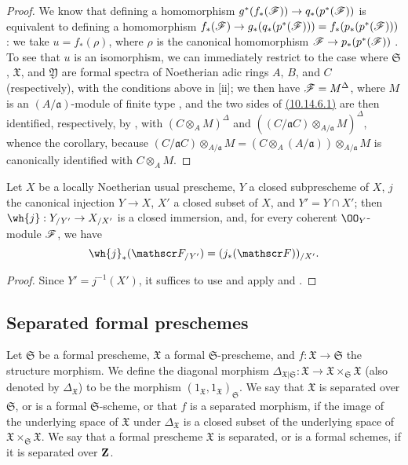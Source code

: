 \begin{proof}
\label{proof-1.10.14.6}
We know that defining a homomorphism $g^*(f_*(\sh{F})) \to q_*(p^*(\sh{F}))$ is equivalent to defining a homomorphism $f_*(\sh{F}) \to g_*(q_*(p^*(\sh{F}))) = f_*(p_*(p^*(\sh{F})))$ :
we take $u=f_*(\rho)$, where $\rho$ is the canonical homomorphism $\sh{F}\to p_*(p^*(\sh{F}))$ .
To see that $u$ is an isomorphism, we can immediately restrict to the case where $\mathfrak{S}$, $\mathfrak{X}$, and $\mathfrak{Y}$ are formal spectra of Noetherian adic rings $A$, $B$, and $C$ (respectively), with the conditions above in [ii];
we then have $\mathscr{F}=M^\Delta$, where $M$ is an $(A/\mathfrak{a})$-module of finite type , and the two sides of \hyperref[1.10.14.6]{(10.14.6.1)} are then identified, respectively, by , with $(C\otimes_A M)^\Delta$ and $((C/\mathfrak{a}C)\otimes_{A/\mathfrak{a}}M)^\Delta$, whence the corollary, because $(C/\mathfrak{a}C)\otimes_{A/\mathfrak{a}}M = (C\otimes_A(A/\mathfrak{a}))\otimes_{A/\mathfrak{a}}M$ is canonically identified with $C\otimes_A M$.
\end{proof}

\begin{cor}[10.14.7]
\label{1.10.14.7}
Let $X$ be a locally Noetherian usual prescheme, $Y$ a closed subprescheme of $X$, $j$ the canonical injection $Y\to X$, $X'$ a closed subset of $X$, and $Y'=Y\cap X'$;
then $\wh{j}:Y_{/Y'}\to X_{/X'}$ is a closed immersion, and, for every coherent $\OO_Y$-module $\mathscr{F}$, we have
\[
    \wh{j}_*(\sh{F}_{/Y'}) = (j_*(\sh{F}))_{/X'}.
\]
\end{cor}

\begin{proof}
\label{proof-1.10.14.7}
Since $Y'=j^{-1}(X')$, it suffices to use  and apply  and .
\end{proof}

\subsection{Separated formal preschemes}
\label{subsection:1.10.15}

\begin{defn}[10.15.1]
\label{1.10.15.1}
Let $\mathfrak{S}$ be a formal prescheme, $\mathfrak{X}$ a formal $\mathfrak{S}$-prescheme, and $f:\mathfrak{X}\to\mathfrak{S}$ the structure morphism.
We define the diagonal morphism $\Delta_{\mathfrak{X}|\mathfrak{S}}:\mathfrak{X}\to\mathfrak{X}\times_\mathfrak{S}\mathfrak{X}$ (also denoted by $\Delta_\mathfrak{X}$) to be the morphism $(1_\mathfrak{X},1_\mathfrak{X})_\mathfrak{S}$.
We say that $\mathfrak{X}$ is separated over $\mathfrak{S}$, or is a formal $\mathfrak{S}$-scheme, or that $f$ is a separated morphism, if the image of the underlying space of $\mathfrak{X}$ under $\Delta_\mathfrak{X}$ is a closed subset of the underlying space of $\mathfrak{X}\times_\mathfrak{S}\mathfrak{X}$.
We say that a formal prescheme $\mathfrak{X}$ is separated, or is a formal schemes, if it is separated over $\mathbf{Z}$.
\end{defn}

